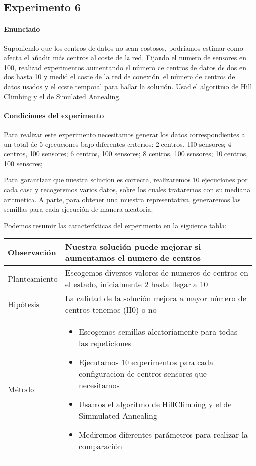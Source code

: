 \subsection{Experimento 6}

\paragraph{Enunciado}

Suponiendo que los centros de datos no sean costosos, podríamos estimar como
afecta el añadir más centros al coste de la red. Fijando el numero de sensores
en 100, realizad experimentos aumentando el
número de centros de datos de dos en dos hasta 10 y medid el coste de la 
red de conexión, el número de centros de datos usados y el coste temporal 
para hallar la solución. Usad el algoritmo de Hill Climbing y el
de Simulated Annealing.

\paragraph{Condiciones del experimento}

Para realizar este experimento necesitamos generar los datos correspondientes
a un total de 5 ejecuciones bajo diferentes criterios: 2 centros, 100 sensores;
4 centros, 100 sensores; 6 centros, 100 sensores; 8 centros, 100 sensores;
10 centros, 100 sensores;

Para garantizar que nuestra solucion es correcta, realizaremos 10 ejecuciones
por cada caso y recogeremos varios datos, sobre los cuales trataremos con
su mediana aritmetica. A parte, para obtener una
muestra representativa, generaremos las semillas para cada ejecución de manera
aleatoria.

Podemos resumir las características del experimento en la siguiente tabla:

\begin{tabular}{ | p{} | p{} | }
  \hline
  Observación & Nuestra solución puede mejorar si aumentamos el numero de
  centros \\
  \hline
  Planteamiento & Escogemos diversos valores de numeros de centros en
  el estado, inicialmente 2 hasta llegar a 10\\
  \hline
  Hipótesis & La calidad de la solución mejora a mayor número de centros 
  tenemos (H0) o no\\
  \hline
  Método & 
    \begin{itemize}
      \item Escogemos semillas aleatoriamente para todas las repeticiones
      \item Ejecutamos 10 experimentos para cada configuracion de centros
        sensores que necesitamos
      \item Usamos el algoritmo de HillClimbing y el de Simmulated Annealing 
      \item Mediremos diferentes parámetros para realizar la comparación  
    \end{itemize}
    \\
  \hline
\end{tabular}

